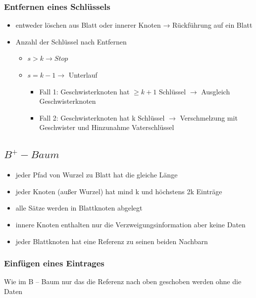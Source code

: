 \documentclass[a4paper]{article}
\begin{document}
    \subsubsection{Entfernen eines Schlüssels}
    \begin{itemize}
        \item entweder löschen aus Blatt oder innerer Knoten → Rückführung auf ein Blatt
        \item Anzahl der Schlüssel nach Entfernen
        
        \begin{itemize}
            \item $s > k \to Stop$
            \item $s = k-1 \to$ Unterlauf
            
            \begin{itemize}
                \item Fall 1: Geschwisterknoten hat $\ge k+1$ Schlüssel $\to$ Ausgleich Geschwisterknoten
                \item Fall 2: Geschwisterknoten hat k Schlüssel $\to$ Verschmelzung mit Geschwister und Hinzunahme Vaterschlüssel
            \end{itemize}
        \end{itemize}
    \end{itemize}

\subsection{$B^+-Baum$}
\begin{itemize}
    \item jeder Pfad von Wurzel zu Blatt hat die gleiche Länge
    \item jeder Knoten (außer Wurzel) hat mind k und höchstens 2k Einträge
    \item alle Sätze werden in Blattknoten abgelegt
    \item innere Knoten enthalten nur die Verzweigungsinformation aber keine Daten
    \item jeder Blattknoten hat eine Referenz zu seinen beiden Nachbarn
\end{itemize}

    \subsubsection{Einfügen eines Eintrages}
    Wie im B – Baum nur das die Referenz nach oben geschoben werden ohne die Daten
    
\end{document}
